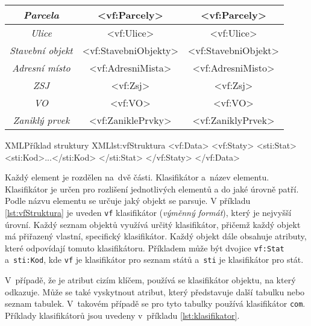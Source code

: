\begin{table}[!h]
\begin{tabular}{|c|c|c|}
    \textit{Parcela}                     & \textless{}vf:Parcely\textgreater{}            & \textless{}vf:Parcely\textgreater{}           \\ \hline
    \textit{Ulice}                       & \textless{}vf:Ulice\textgreater{}              & \textless{}vf:Ulice\textgreater{}             \\ \hline
    \textit{Stavební objekt}             & \textless{}vf:StavebniObjekty\textgreater{}    & \textless{}vf:StavebniObjekt\textgreater{}    \\ \hline
    \textit{Adresní místo}               & \textless{}vf:AdresniMista\textgreater{}       & \textless{}vf:AdresniMisto\textgreater{}      \\ \hline
    \textit{ZSJ}                         & \textless{}vf:Zsj\textgreater{}                & \textless{}vf:Zsj\textgreater{}               \\ \hline
    \textit{VO}                          & \textless{}vf:VO\textgreater{}                 & \textless{}vf:VO\textgreater{}                \\ \hline
    \textit{Zaniklý prvek}               & \textless{}vf:ZaniklePrvky\textgreater{}       & \textless{}vf:ZaniklyPrvek\textgreater{}      \\ \hline
    \end{tabular}
\end{table}

\newpage

\begin{code}{XML}{Příklad struktury XML}{lst:vfStruktura}
<vf:Data>
    <vf:Staty>
        <sti:Stat>
            <sti:Kod>...</sti:Kod>
        </sti:Stat>
    </vf:Staty>
</vf:Data>
\end{code}

Každý element je rozdělen na~dvě části.
Klasifikátor a~název elementu.
Klasifikátor je určen pro rozlišení jednotlivých elementů a do jaké úrovně patří.
Podle názvu elementu se určuje jaký objekt se parsuje.
V příkladu \ref{lst:vfStruktura} je uveden \texttt{vf} klasifikátor (\textit{výměnný formát}), který je nejvyšší úrovní.
Každý seznam objektů využívá určitý klasifikátor, přičemž každý objekt má přiřazený vlastní, specifický klasifikátor.
Každý objekt dále obsahuje atributy, které odpovídají tomuto klasifikátoru.
Příkladem může být dvojice \texttt{vf:Stat} a~\texttt{sti:Kod},
kde \texttt{vf} je klasifikátor pro seznam států a~\texttt{sti} je klasifikátor pro stát.

V~případě, že je atribut cizím klíčem, používá se klasifikátor objektu, na který odkazuje.
Může se také vyskytnout atribut, který představuje další tabulku nebo seznam tabulek.
V~takovém případě se pro tyto tabulky používá klasifikátor \texttt{com}.
Příklady klasifikátorů jsou uvedeny v~příkladu \ref{lst:klasifikator}.

